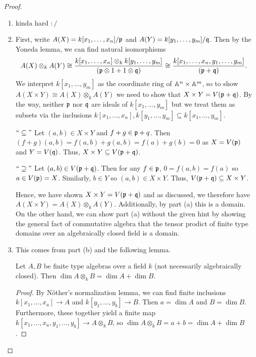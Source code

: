 \begin{proof}
    \begin{enumerate}[label = (\alph*)]
        \item kinda hard $:/$

        \item First, write $A(X) = k[x_1, \dots, x_n]/\mathfrak p$ and $A(Y) = k[y_1, \dots, y_m]/\mathfrak q$. Then by the Yoneda lemma, we can find natural isomorphisms
        $$
            A(X) \otimes_k A(Y) \cong \frac{k[x_1, \dots, x_n] \otimes_k k[y_1, \dots, y_m]}{(\mathfrak p \otimes 1 + 1 \otimes \mathfrak q)} \cong \frac{k[x_1, \dots, x_n, y_1, \dots, y_m]}{(\mathfrak p + \mathfrak q)}.
        $$
        We interpret $k[x_1, \dots, y_m]$ as the coordinate ring of $\mathbb A^n \times \mathbb A^m$, so to show $A(X \times Y) \cong A(X) \otimes_k A(Y)$ we need to show that $X \times Y = V(\mathfrak p + \mathfrak q)$. By the way, neither $\mathfrak p$ nor $\mathfrak q$ are ideals of $k[x_1, \dots, y_m]$ but we treat them as subsets via the inclusions $k[x_1, \dots, x_n], k[y_1, \dots, y_m] \subseteq k[x_1, \dots, y_m]$.

        $``\subseteq"$ Let $(a, b) \in X \times Y$ and $f + g \in \mathfrak p + q$. Then $(f + g)(a, b) = f(a, b) + g(a, b) = f(a) + g(b) = 0$ as $X = V(\mathfrak p)$ and $Y = V(\mathfrak q)$. Thus, $X \times Y \subseteq V(\mathfrak p + \mathfrak q)$.

        $``\supseteq"$ Let $(a, b) \in V(\mathfrak p + \mathfrak q)$. Then for any $f \in \mathfrak p$, $0 = f(a, b) = f(a)$ so $a \in V(\mathfrak p) = X$. Similarly, $b \in Y$ so $(a, b) \in X \times Y$. Thus, $V(\mathfrak p + \mathfrak q) \subseteq X \times Y$.

        Hence, we have shown $X \times Y = V(\mathfrak p + \mathfrak q)$ and as discussed, we therefore have $A(X \times Y) = A(X) \otimes_k A(Y)$. Additionally, by part (a) this is a domain. On the other hand, we can show part (a) without the given hint by showing the general fact of commutative algebra that the tensor prodict of finite type domains over an algebraically closed field is a domain.

        \item This comes from part (b) and the following lemma.
        \begin{lemma}
            Let $A, B$ be finite type algebras over a field $k$ (not necessarily algebraically closed). Then $\dim A \otimes_k B = \dim A + \dim B$.
        \end{lemma}
        \begin{proof}
            By N\"other's normalization lemma, we can find finite inclusions $k[x_1, \dots, x_a] \longrightarrow A$ and $k[y_1, \dots, y_b] \longrightarrow B$. Then $a = \dim A$ and $B = \dim B$. Furthermore, these together yield a finite map $k[x_1, \dots, x_a, y_1, \dots, y_b] \longrightarrow A \otimes_k B$, so $\dim A \otimes_k B = a + b = \dim A + \dim B$.
        \end{proof}


\end{enumerate}
\end{proof}
